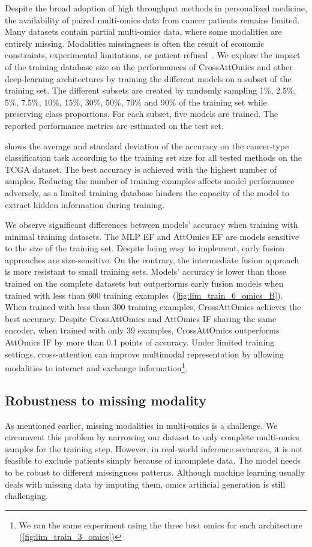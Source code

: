\documentclass[../main.tex]{subfiles}
\begin{document}
		Despite the broad adoption of high throughput methods in personalized medicine, the availability of paired multi-omics data from cancer patients remains limited.
		Many datasets contain partial multi-omics data, where some modalities are entirely missing.
		Modalities missingness is often the result of economic constraints, experimental limitations, or patient refusal~\cite{Kang2021}.
		We explore the impact of the training database size on the performances of CrossAttOmics and other deep-learning architectures by training the different models on a subset of the training set.
		The different subsets are created by randomly sampling 1\%, 2.5\%, 5\%, 7.5\%, 10\%, 15\%, 30\%, 50\%, 70\% and 90\% of the training set while preserving class proportions.
		For each subset, five models are trained.
		The reported performance metrics are estimated on the test set.

		 shows the average and standard deviation of the accuracy on the cancer-type classification task according to the training set size for all tested methods on the TCGA dataset.
		The best accuracy is achieved with the highest number of samples.
		Reducing the number of training examples affects model performance adversely, as a limited training database hinders the capacity of the model to extract hidden information during training.

		We observe significant differences between models' accuracy when training with minimal training datasets.
		The MLP EF and AttOmics EF are models sensitive to the size of the training set.
		Despite being easy to implement, early fusion approaches are size-sensitive.
		On the contrary, the intermediate fusion approach is more resistant to small training sets.
		Models' accuracy is lower than those trained on the complete datasets but outperforms early fusion models when trained with less than 600 training examples~(\cref{fig:lim_train_6_omics_B}).
		When trained with less than 300 training examples, CrossAttOmics achieves the best accuracy.
		Despite CrossAttOmics and AttOmics IF sharing the same encoder, when trained with only 39 examples, CrossAttOmics outperforms AttOmics IF by more than 0.1 points of accuracy.
		Under limited training settings, cross-attention can improve multimodal representation by allowing modalities to interact and exchange information\footnote{We ran the same experiment using the three best omics for each architecture (\cref{fig:lim_train_3_omics})}.

	\subsection{Robustness to missing modality}
		As mentioned earlier, missing modalities in multi-omics is a challenge.
		We circumvent this problem by narrowing our dataset to only complete multi-omics samples for the training step.
		However, in real-world inference scenarios, it is not feasible to exclude patients simply because of incomplete data.
		The model needs to be robust to different missingness patterns.
		Although machine learning usually deals with missing data by imputing them, omics artificial generation is still challenging.
\end{document}
